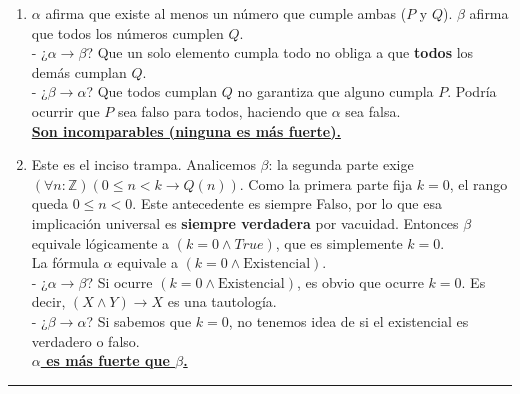 \begin{enumerate}[label=\textbf{\alph*)}]
    \vspace{0.4cm}
    \item $\alpha$ afirma que existe al menos un número que cumple ambas ($P$ y $Q$). $\beta$ afirma que todos los números cumplen $Q$. \\
    - ¿$\alpha \rightarrow \beta$? Que un solo elemento cumpla todo no obliga a que \textbf{todos} los demás cumplan $Q$. \\
    - ¿$\beta \rightarrow \alpha$? Que todos cumplan $Q$ no garantiza que alguno cumpla $P$. Podría ocurrir que $P$ sea falso para todos, haciendo que $\alpha$ sea falsa. \\
    \underline{\textbf{Son incomparables (ninguna es más fuerte).}}

    \vspace{0.4cm}
    \item Este es el inciso trampa. Analicemos $\beta$: la segunda parte exige $(\forall n:\mathbb{Z})(0 \leq n < k \rightarrow Q(n))$. Como la primera parte fija $k=0$, el rango queda $0 \leq n < 0$. Este antecedente es siempre Falso, por lo que esa implicación universal es \textbf{siempre verdadera} por vacuidad. Entonces $\beta$ equivale lógicamente a $(k=0 \wedge True)$, que es simplemente $k=0$. \\
    La fórmula $\alpha$ equivale a $(k=0 \wedge \text{Existencial})$. \\
    - ¿$\alpha \rightarrow \beta$? Si ocurre $(k=0 \wedge \text{Existencial})$, es obvio que ocurre $k=0$. Es decir, $(X \wedge Y) \rightarrow X$ es una tautología. \\
    - ¿$\beta \rightarrow \alpha$? Si sabemos que $k=0$, no tenemos idea de si el existencial es verdadero o falso. \\
    \underline{\textbf{$\alpha$ es más fuerte que $\beta$.}}

\end{enumerate}

\vspace{0.5cm}
\hrule
\vspace{0.5cm}